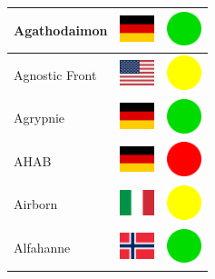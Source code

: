 \documentclass[12pt, a4paper, twoside]{report}
\begin{document}
\begin{center}
\begin{longtable}{|p{5cm}|p{2cm}|p{2cm}|}
 Agathodaimon                                               & \includegraphics[width=1cm]{../4x3/de} &   \includegraphics[width=1cm]{../likes/y} \\ \hline
 Agnostic Front                                             & \includegraphics[width=1cm]{../4x3/us} &   \includegraphics[width=1cm]{../likes/m} \\ \hline
 Agrypnie                                                   & \includegraphics[width=1cm]{../4x3/de} &   \includegraphics[width=1cm]{../likes/y} \\ \hline
 AHAB                                                       & \includegraphics[width=1cm]{../4x3/de} &   \includegraphics[width=1cm]{../likes/n} \\ \hline
 Airborn                                                    & \includegraphics[width=1cm]{../4x3/it} &   \includegraphics[width=1cm]{../likes/m} \\ \hline
 Alfahanne                                                  & \includegraphics[width=1cm]{../4x3/no} &   \includegraphics[width=1cm]{../likes/y} \\ \hline

\end{longtable}
\end{center}
\end{document}
